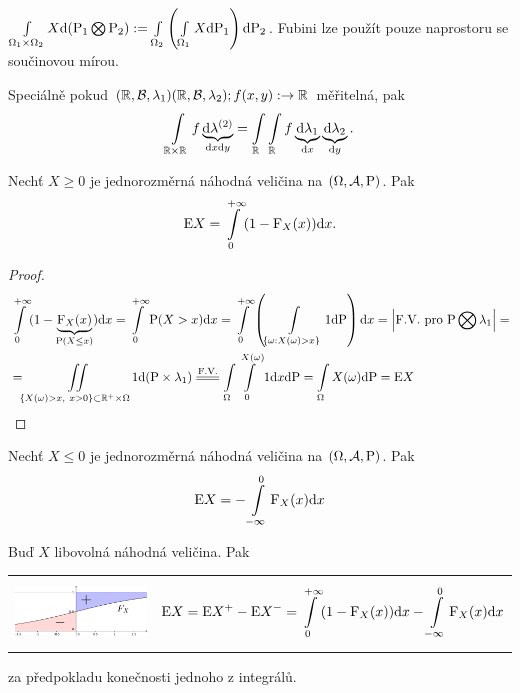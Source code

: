 \begin{remark}
	$\int\limits_{\Omega_1\times\Omega_2}X\mathrm{d}(\mathrm{P}_1\bigotimes \mathrm{P}_2):=\int\limits_{\Omega_2}\left(\int\limits_{\Omega_1}X\mathrm{d} \mathrm{P}_1\right)\mathrm{d} \mathrm{P}_2$. 
	Fubini lze použít pouze na\newline prostoru se součinovou mírou.
\end{remark}
\begin{remark}
	Speciálně pokud $(\mathbb{R},\mathcal{B},\lambda_1)(\mathbb{R},\mathcal{B},\lambda_2);f(x,y):\to\mathbb{R}$ měřitelná, pak $$\int\limits_{\mathbb{R}\times\mathbb{R}}f\underbrace{\mathrm{d}\lambda^{(2)}}_{\mathrm{d} x\mathrm{d} y}=\int\limits_{\mathbb{R}}\int\limits_{\mathbb{R}}f\underbrace{\mathrm{d}\lambda_1}_{\mathrm{d} x}\underbrace{\mathrm{d}\lambda_2}_{\mathrm{d} y}.$$
\end{remark}
\begin{theorem}
	Nechť $X\geq 0$ je jednorozměrná náhodná veličina na $(\Omega,\mathcal{A},\mathrm{P})$. Pak $$\mathrm{E} X=\int\limits_{0}^{+\infty}(1-\mathrm{F}_X(x))\mathrm{d} x.$$\begin{proof}
		\[
		\begin{split}
		&\int\limits_{0}^{+\infty}(1-\underbrace{\FF_X(x)}_{\PP(X\leq x)})\dif x=\int\limits_{0}^{+\infty} \PP(X>x)\dif x=\int\limits_{0}^{+\infty}\left( \int\limits_{\{ \omega:X(\omega)>x \}}1 \dif \PP \right)\dif x=\Bigl|\text{F.V. pro }\PP\bigotimes\lambda_1\Bigr|= \\ &=\iint\limits_{\{X(\omega)>x,~x>0  \}\subset \R^+\times\Omega}1\dif(\PP\times \lambda_1)\equal{\text{F.V.}}\int\limits_{\Omega}\int\limits_{0}^{X(\omega)}1\dif x\dif \PP=\int\limits_{\Omega}X(\omega)\dif \PP=\E X 
		\end{split}
		\] 
	\end{proof}
\end{theorem}
\begin{theorem}
Nechť $X\leq 0$ je jednorozměrná náhodná veličina na $(\Omega,\mathcal{A},\mathrm{P})$. Pak
$$ \mathrm{E} X=-\int\limits_{-\infty}^0 \mathrm{F}_X(x)\mathrm{d} x $$
\end{theorem}
\begin{dusl}
	Buď $X$ libovolná náhodná veličina. Pak \newline
	\begin{tabular}{m{7cm} m{8cm}}
		\includegraphics[width=7cm]{ex} & $$ \mathrm{E} X=\mathrm{E} X^+-\mathrm{E} X^-=\int\limits_{0}^{+\infty}(1-\mathrm{F}_X(x))\mathrm{d} x-\int\limits_{-\infty}^0 \mathrm{F}_X(x)\mathrm{d} x $$  
	\end{tabular} \newline
	za předpokladu konečnosti jednoho z integrálů.
\end{dusl}


